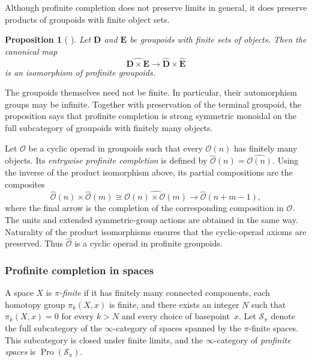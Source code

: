 \documentclass{amsart}
\newcommand{\bD}{\mathbf{D}}
\newcommand{\bE}{\mathbf{E}}
\newcommand{\calO}{\mathcal{O}}
\newcommand{\Pro}{\operatorname{Pro}}
\newtheorem{prop}[theorem]{Proposition}%
\theoremstyle{definition}
\numberwithin{equation}{section}
\begin{document}
Although profinite completion does not preserve limits in general, it
does preserve products of groupoids with finite object sets.

\begin{prop}[
\textnormal{\cite[Proposition~4.23]{Horel_profinite_groupoids}}]
\label{prop: profinite completion preserves products of groupoids}
Let $\bD$ and $\bE$ be groupoids with finite sets of objects. Then the
canonical map
\[
\widehat{\bD\times\bE}
\longrightarrow
\widehat{\bD}\times\widehat{\bE}
\]
is an isomorphism of profinite groupoids.
\end{prop}

The groupoids themselves need not be finite. In particular, their
automorphism groups may be infinite. Together with preservation of
the terminal groupoid, the proposition says that profinite completion
is strong symmetric monoidal on the full subcategory of groupoids
with finitely many objects.

Let $\calO$ be a cyclic operad in groupoids such that every
$\calO(n)$ has finitely many objects. Its \emph{entrywise profinite
completion} is defined by
$\widehat{\calO}(n)=\widehat{\calO(n)}$. Using the inverse of the
product isomorphism above, its partial compositions are the
composites
\[
\widehat{\calO}(n)\times\widehat{\calO}(m)
\cong
\widehat{\calO(n)\times\calO(m)}
\longrightarrow
\widehat{\calO}(n+m-1),
\]
where the final arrow is the completion of the corresponding
composition in $\calO$. The units and extended symmetric-group
actions are obtained in the same way. Naturality of the product
isomorphisms ensures that the cyclic-operad axioms are preserved.
Thus $\widehat{\calO}$ is a cyclic operad in profinite groupoids.


\subsubsection{Profinite completion in spaces}

A space $X$ is \emph{$\pi$-finite} if it has finitely many connected
components, each homotopy group $\pi_k(X,x)$ is finite, and there
exists an integer $N$ such that $\pi_k(X,x)=0$ for every $k>N$ and
every choice of basepoint~$x$. Let $\mathcal S_\pi$ denote the full
subcategory of the $\infty$-category of spaces spanned by the
$\pi$-finite spaces. This subcategory is closed under finite limits,
and the $\infty$-category of \emph{profinite spaces} is
$\Pro(\mathcal S_\pi)$.
\end{document}
